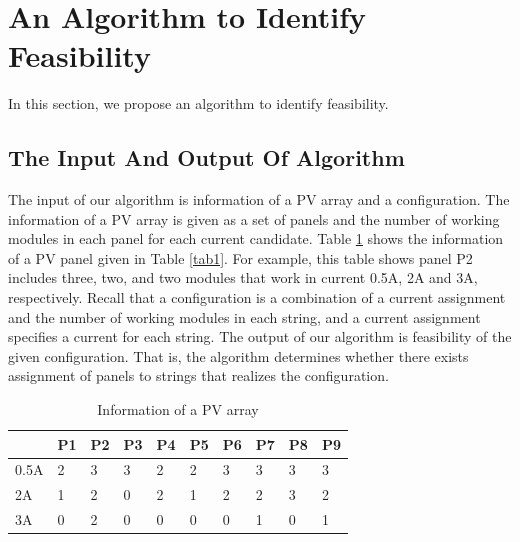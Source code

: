 \documentclass[conference]{IEEEtran}
\begin{document}
\section{An Algorithm to Identify Feasibility}
In this section, we propose an algorithm to identify feasibility.
\subsection{The Input And Output Of Algorithm}
The input of our algorithm is information of a PV array and a configuration. The information of a PV array is given as a set of panels and the number of working modules in each panel for each current candidate. Table \ref{mpp3-1} shows the information of a PV panel given in Table \ref{tab1}. For example, this table shows panel P2 includes three, two, and two modules that work in current 0.5A, 2A and 3A, respectively. Recall that a configuration is a combination of a current assignment and the number of working modules in each string, and a current assignment specifies a current for each string. The output of our algorithm is feasibility of the given configuration. That is, the algorithm determines whether there exists assignment of panels to strings that realizes the configuration.
\begin{table}[htbp] 
\caption{Information of a PV array}
\begin{center}
\begin{tabular}{l|lllllllll}
    & P1 & P2 & P3 & P4 & P5 & P6 & P7 & P8 & P9 \\ \hline
0.5A & 2  & 3  & 3  & 2  & 2  & 3  & 3  & 3  & 3  \\
 2A & 1  & 2  & 0  & 2  & 1  & 2  & 2  & 3  & 2  \\
 3A & 0  & 2  & 0  & 0  & 0  & 0  & 1  & 0  & 1 
\end{tabular}\label{mpp3-1}
\end{center}
\end{table}  
\end{document}
